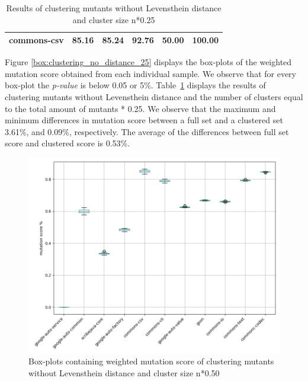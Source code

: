 \documentclass[conference,draftclsnofoot,onecolumn]{IEEEtran}
\begin{document}
\begin{table}[ht]
\begin{tabular}{|l|c|c|c|c|c|}
commons-csv                   & 85.16                                                                                 & 85.24                                                                                     & 92.76                                                                              & 50.00                                                                               & 100.00                                                                             \\ \hline
\end{tabular}
\caption{\label{tab:clustering_no_distance_25}Results of clustering mutants without Levensthein distance and cluster size n*0.25}
\end{table}

Figure \ref{box:clustering_no_distance_25} displays the box-plots of the weighted mutation score obtained from each individual sample.
We observe that for every box-plot the \textit{p-value} is below 0.05 or 5\%.
Table~\ref{tab:clustering_no_distance_25} displays the results of clustering mutants without Levensthein distance and the number of clusters equal to the total amount of mutants * 0.25. 
We observe that the maximum and minimum differences in mutation score between a full set and a clustered set  3.61\%, and 0.09\%, respectively.
The average of the differences between full set score and clustered score is 0.53\%.

\begin{figure}[ht]
\includegraphics[width=0.5 \textwidth]{images/boxplot_summary/boxplot_hc_no_distance_0.5.png}
\caption{\label{box:clustering_no_distance_50}Box-plots containing weighted mutation score of clustering mutants without Levensthein distance and cluster size n*0.50}
\end{figure}
\end{document}
